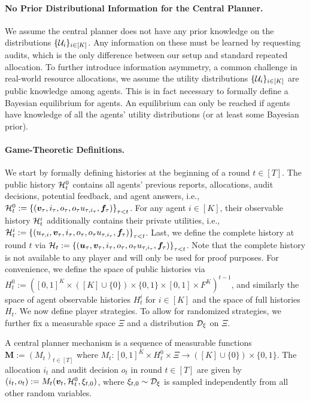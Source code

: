 \paragraph{No Prior Distributional Information for the Central Planner.}
We assume the central planner does not have any prior knowledge on the distributions $\{\mathcal{U}_i\}_{i\in[K]}$. Any information on these must be learned by requesting audits, which is the only difference between our setup and standard repeated allocation.
To further introduce information asymmetry, a common challenge in real-world resource allocations, we assume the utility distributions $\{\mathcal{U}_i\}_{i\in [K]}$ are public knowledge among agents. This is in fact necessary to formally define a Bayesian equilibrium for agents. An equilibrium can only be reached if agents have knowledge of all the agents' utility distributions (or at least some Bayesian prior).

\paragraph{Game-Theoretic Definitions.}
We start by formally defining histories at the beginning of a round $t\in[T]$. The {public history} $\mathcal{H}_t^0$ contains all agents' previous reports, allocations, audit decisions, potential feedback, and agent answers, {i.e.}, $\mathcal{H}_t^0:=\left\{ (\bm v_\tau,i_\tau,o_\tau,o_\tau u_{\tau,i_\tau}, \bm f_\tau) \right\}_{\tau<t}$. For any agent $i\in[K]$, their {observable history} $\mathcal{H}_t^i$ additionally contains their private utilities, {i.e.}, $\mathcal{H}_t^i:=\left\{ (u_{\tau,i},\bm v_\tau,i_\tau,o_\tau,o_\tau u_{\tau,i_\tau},\bm f_\tau) \right\}_{\tau<t}$. Last, we define the {complete history} at round $t$ via $\mathcal{H}_t:=\left\{ (\bm u_{\tau},\bm v_\tau,i_\tau,o_\tau,o_\tau u_{\tau,i_\tau}, \bm f_\tau) \right\}_{\tau<t}$. Note that the complete history is not available to any player and will only be used for proof purposes. For convenience, we define the space of public histories via $H_t^0:=([0,1]^K \times([K]\cup\{0\})\times \{0,1\}\times [0,1]\times F^K)^{t-1}$, and similarly the space of agent observable histories $H_t^i$ for $i\in[K]$ and the space of full histories $H_t$. We now define player strategies. To allow for randomized strategies, we further fix a measurable space $\Xi$ and a distribution $\mathcal{D}_\xi$ on $\Xi$.

\begin{definition}
    A {central planner mechanism} is a sequence of measurable functions $\bm M:=(M_t)_{t\in[T]}$ where $M_t:[0,1]^K\times H_t^0\times \Xi \to ([K]\cup\{0\}) \times \{0,1\}$. The allocation $i_t$ and audit decision $o_t$ in round $t\in[T]$ are given by $(i_t,o_t):=M_t(\bm v_t,\mathcal{H}_t^0,\xi_{t,0})$, where $\xi_{t,0}\sim\mathcal{D}_\xi$ is sampled independently from all other random variables.
\end{definition}

